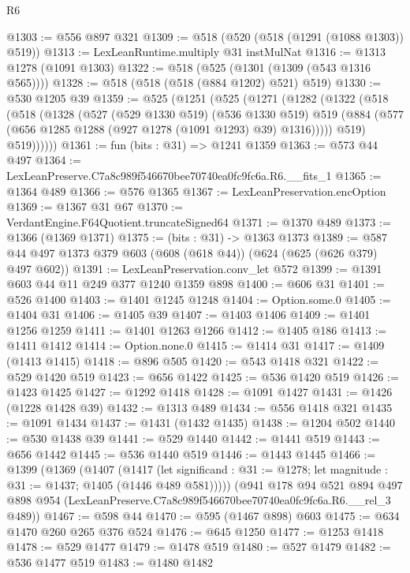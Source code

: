 \begin{lexlean}{R6}
\begin{coremodule}
@1303 := @556 @897 @321
@1309 := @518 (@520 (@518 (@1291 (@1088 @1303)) @519))
@1313 := LexLeanRuntime.multiply @31 instMulNat
@1316 := @1313 @1278 (@1091 @1303)
@1322 := @518 (@525 (@1301 (@1309 (@543 @1316 @565))))
@1328 := @518 (@518 (@518 (@884 @1202) @521) @519)
@1330 := @530 @1205 @39
@1359 := @525
    (@1251
      (@525
        (@1271
          (@1282
            (@1322
              (@518
                (@518
                  (@1328
                    (@527
                      (@529 @1330 @519)
                      (@536 @1330 @519)
                      @519
                      (@884 (@577 (@656 @1285 @1288 (@927 @1278 (@1091 @1293) @39) @1316)))))
                  @519)
                @519))))))
@1361 := fun (bits : @31) => @1241 @1359
@1363 := @573 @44 @497
@1364 := LexLeanPreserve.C7a8c989f546670bee70740ea0fc9fc6a.R6.__fits_1
@1365 := @1364 @489
@1366 := @576 @1365
@1367 := LexLeanPreservation.encOption
@1369 := @1367 @31 @67
@1370 := VerdantEngine.F64Quotient.truncateSigned64
@1371 := @1370 @489
@1373 := @1366 (@1369 @1371)
@1375 := (bits : @31) -> @1363 @1373
@1389 := @587 @44 @497 @1373 @379 @603 (@608 (@618 @44)) (@624 (@625 (@626 @379) @497 @602))
@1391 := LexLeanPreservation.conv_let @572
@1399 := @1391 @603 @44 @11 @249 @377 @1240 @1359 @898
@1400 := @606 @31
@1401 := @526 @1400
@1403 := @1401 @1245 @1248
@1404 := Option.some.{0}
@1405 := @1404 @31
@1406 := @1405 @39
@1407 := @1403 @1406
@1409 := @1401 @1256 @1259
@1411 := @1401 @1263 @1266
@1412 := @1405 @186
@1413 := @1411 @1412
@1414 := Option.none.{0}
@1415 := @1414 @31
@1417 := @1409 (@1413 @1415)
@1418 := @896 @505
@1420 := @543 @1418 @321
@1422 := @529 @1420 @519
@1423 := @656 @1422
@1425 := @536 @1420 @519
@1426 := @1423 @1425
@1427 := @1292 @1418
@1428 := @1091 @1427
@1431 := @1426 (@1228 @1428 @39)
@1432 := @1313 @489
@1434 := @556 @1418 @321
@1435 := @1091 @1434
@1437 := @1431 (@1432 @1435)
@1438 := @1204 @502
@1440 := @530 @1438 @39
@1441 := @529 @1440
@1442 := @1441 @519
@1443 := @656 @1442
@1445 := @536 @1440 @519
@1446 := @1443 @1445
@1466 := @1399
    (@1369
      (@1407
        (@1417
          (let significand : @31 := @1278; let magnitude : @31 := @1437; @1405 (@1446 @489 @581)))))
    (@941
      @178
      @94
      @521
      @894
      @497
      @898
      @954
      (LexLeanPreserve.C7a8c989f546670bee70740ea0fc9fc6a.R6.__rel_3 @489))
@1467 := @598 @44
@1470 := @595 (@1467 @898) @603
@1475 := @634 @1470 @260 @265 @376 @524
@1476 := @645 @1250
@1477 := @1253 @1418
@1478 := @529 @1477
@1479 := @1478 @519
@1480 := @527 @1479
@1482 := @536 @1477 @519
@1483 := @1480 @1482

\end{coremodule}
\end{lexlean}
